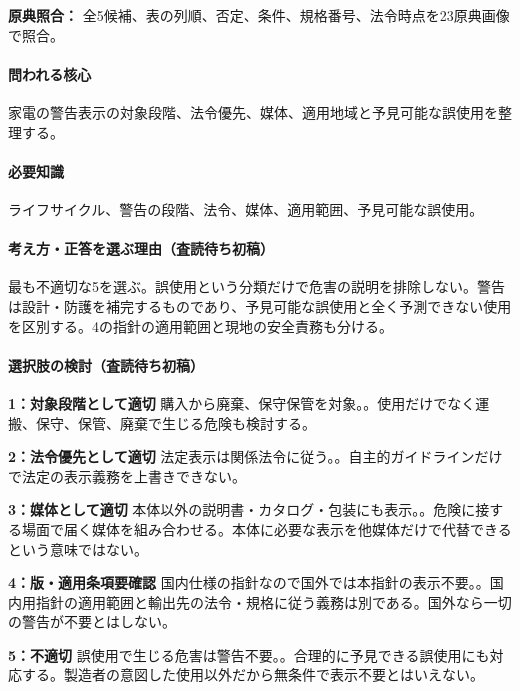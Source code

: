 \noindent\textbf{原典照合：} 全5候補、表の列順、否定、条件、規格番号、法令時点を23原典画像で照合。\par

\paragraph{問われる核心} 家電の警告表示の対象段階、法令優先、媒体、適用地域と予見可能な誤使用を整理する。

\paragraph{必要知識} ライフサイクル、警告の段階、法令、媒体、適用範囲、予見可能な誤使用。

\paragraph{考え方・正答を選ぶ理由（査読待ち初稿）} 最も不適切な5を選ぶ。誤使用という分類だけで危害の説明を排除しない。警告は設計・防護を補完するものであり、予見可能な誤使用と全く予測できない使用を区別する。4の指針の適用範囲と現地の安全責務も分ける。

\paragraph{選択肢の検討（査読待ち初稿）}\mbox{}\par

\noindent\textbf{1：対象段階として適切} 購入から廃棄、保守保管を対象。。使用だけでなく運搬、保守、保管、廃棄で生じる危険も検討する。\par

\noindent\textbf{2：法令優先として適切} 法定表示は関係法令に従う。。自主的ガイドラインだけで法定の表示義務を上書きできない。\par

\noindent\textbf{3：媒体として適切} 本体以外の説明書・カタログ・包装にも表示。。危険に接する場面で届く媒体を組み合わせる。本体に必要な表示を他媒体だけで代替できるという意味ではない。\par

\noindent\textbf{4：版・適用条項要確認} 国内仕様の指針なので国外では本指針の表示不要。。国内用指針の適用範囲と輸出先の法令・規格に従う義務は別である。国外なら一切の警告が不要とはしない。\par

\noindent\textbf{5：不適切} 誤使用で生じる危害は警告不要。。合理的に予見できる誤使用にも対応する。製造者の意図した使用以外だから無条件で表示不要とはいえない。\par

